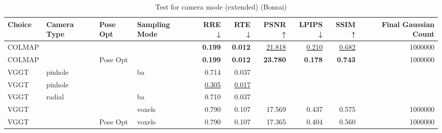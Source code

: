 \begin{table}[H]
\caption{Test for camera mode (extended) (Bonsai)}
\label{tab:10_camera_type_ext_bonsai}
\begin{tabular}{llllrrrrrr}
\toprule
Choice & Camera Type & Pose Opt & Sampling Mode & RRE ↓ & RTE ↓ & PSNR ↑ & LPIPS ↓ & SSIM ↑ & Final Gaussian Count \\
\midrule
COLMAP &  &  &  & \textbf{0.199} & \textbf{0.012} & \underline{21.818} & \underline{0.210} & \underline{0.682} & 1000000 \\
COLMAP &  & Pose Opt &  & \textbf{0.199} & \textbf{0.012} & \textbf{23.780} & \textbf{0.178} & \textbf{0.743} & 1000000 \\
VGGT & pinhole &  & ba & 0.714 & 0.037 &  &  &  &  \\
VGGT & pinhole &  &  & \underline{0.305} & \underline{0.017} &  &  &  &  \\
VGGT & radial &  & ba & 0.710 & 0.037 &  &  &  &  \\
VGGT &  &  & voxels & 0.790 & 0.107 & 17.569 & 0.437 & 0.575 & 1000000 \\
VGGT &  & Pose Opt & voxels & 0.790 & 0.107 & 17.365 & 0.404 & 0.560 & 1000000 \\
\bottomrule
\end{tabular}
\end{table}
